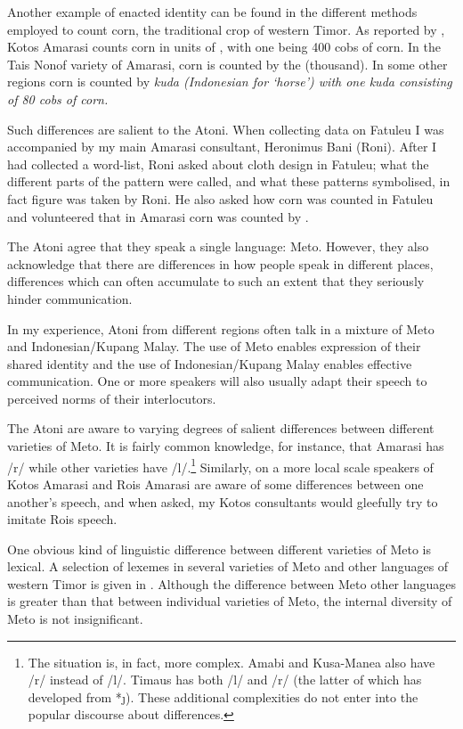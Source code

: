 Another example of enacted identity can be found in the 
different methods employed to count corn,
the traditional crop of western Timor.
As reported by \cite{grba11}, Kotos Amarasi counts
corn in units of , with one  being 400 cobs of corn.
In the Tais Nonof variety of Amarasi,
corn is counted by the  (thousand).
In some other regions corn is counted by \it{kuda} (Indonesian for `horse')
with one \it{kuda} consisting of 80 cobs of corn.

Such differences are salient to the Atoni.
When collecting data on Fatule{\Q}u I was accompanied
by my main Amarasi consultant, Heronimus Bani (Roni).
After I had collected a word-list,
Roni asked about cloth design in Fatule{\Q}u;
what the different parts of the pattern were called,
and what these patterns symbolised, in fact
figure  was taken by Roni.
He also asked how corn was counted in Fatule{\Q}u
and volunteered that in Amarasi corn was counted by .

The Atoni agree that they speak a single language: Meto.
However, they also acknowledge that there are differences in how people speak
in different places, differences which can often accumulate to such an
extent that they seriously hinder communication.

In my experience, Atoni from different regions
often talk in a mixture of Meto and Indonesian/Kupang Malay.
The use of Meto enables expression of their shared identity and
the use of Indonesian/Kupang Malay enables effective communication.
One or more speakers will also usually adapt their speech to
perceived norms of their interlocutors.

The Atoni are aware to varying degrees of salient differences between different varieties of Meto.
It is fairly common knowledge, for instance, that Amarasi has /r/ while
other varieties have /l/.\footnote{
		The situation is, in fact, more complex.
		Amabi and Kusa-Manea also have /r/ instead of /l/.
		Timaus has both /l/ and /r/
		(the latter of which has developed from *\j).
		These additional complexities do not enter into the
		popular discourse about differences.}
Similarly, on a more local scale speakers of Kotos Amarasi and Ro{\Q}is Amarasi
are aware of some differences between one another's speech,
and when asked, my Kotos consultants would gleefully try to imitate Ro{\Q}is speech.

One obvious kind of linguistic difference between
different varieties of Meto is lexical.
A selection of lexemes in several varieties of Meto
and other languages of western Timor is given in .
Although the difference between Meto other languages
is greater than that between individual varieties of Meto,
the internal diversity of Meto is not insignificant.

